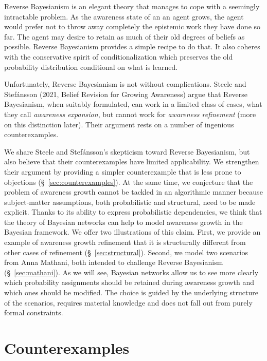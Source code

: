 \documentclass[
  11pt,
  dvipsnames,enabledeprecatedfontcommands]{scrartcl}
\begin{document}
Reverse Bayesianism is an elegant theory that manages to cope with a
seemingly intractable problem. As the awareness state of an an agent
grows, the agent would prefer not to throw away completely the epistemic
work they have done so far. The agent may desire to retain as much of
their old degrees of beliefs as possible. Reverse Bayesianism provides a
simple recipe to do that. It also coheres with the conservative spirit
of conditionalization which preserves the old probability distribution
conditional on what is learned.

Unfortunately, Reverse Bayesianism is not without complications. Steele
and Stefánsson (2021, Belief Revision for Growing Awareness) argue that
Reverse Bayesianism, when suitably formulated, can work in a limited
class of cases, what they call \textit{awareness expansion}, but cannot
work for \textit{awareness refinement} (more on this distinction later).
Their argument rests on a number of ingenious counterexamples.

We share Steele and Stefánsson's skepticism toward Reverse Bayesianism,
but also believe that their counterexamples have limited applicability.
We strengthen their argument by providing a simpler counterexample that
is less prone to objections (\S ~\ref{sec:counterexamples}). At the same
time, we conjecture that the problem of awareness growth cannot be
tackled in an algorithmic manner because subject-matter assumptions,
both probabilistic and structural, need to be made explicit. Thanks to
its ability to express probabilistic dependencies, we think that the
theory of Bayesian networks can help to model awareness growth in the
Bayesian framework. We offer two illustrations of this claim. First, we
provide an example of awareness growth refinement that it is
structurally different from other cases of refinement
(\S ~\ref{sec:structural}). Second, we model two scenarios from Anna
Mathani, both intended to challenge Reverse Bayesianism
(\S ~\ref{sec:mathani}). As we will see, Bayesian networks allow us to
see more clearly which probability assignments should be retained during
awareness growth and which ones should be modified. The choice is guided
by the underlying structure of the scenarios, requires material
knowledge and does not fall out from purely formal constraints.

\hypertarget{counterexamples}{%
\section{Counterexamples}\label{counterexamples}}
\end{document}
